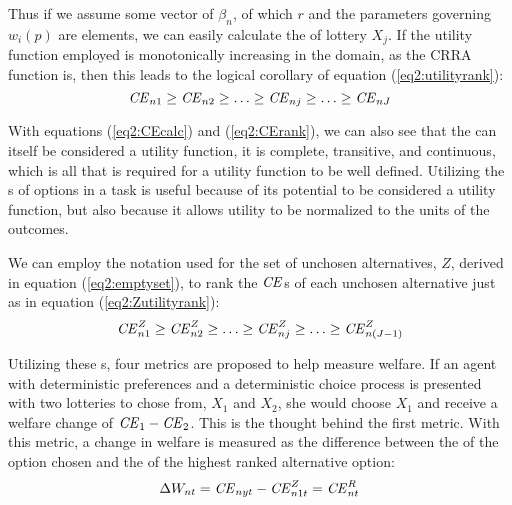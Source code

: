 \documentclass[../main.tex]{subfiles}
\begin{document}
Thus if we assume some vector of $\beta_n$, of which $r$ and the parameters governing $w_i(p)$ are elements, we can easily calculate the {\CE} of lottery $X_j$.{\footnotemark}
If the utility function employed is monotonically increasing in the domain, as the CRRA function is, then this leads to the  logical corollary of equation (\ref{eq2:utilityrank}):
\begin{equation}
	\label{eq2:CErank}
	{\ensuremath{\mathit{CE}}}_{n1} \geq {\ensuremath{\mathit{CE}}}_{n2} \geq \ldots \geq {\ensuremath{\mathit{CE}}}_{nj} \geq \ldots \geq {\ensuremath{\mathit{CE}}}_{nJ}
\end{equation}

\addtocounter{footnote}{-1}

With equations (\ref{eq2:CEcalc}) and (\ref{eq2:CErank}), we can also see that the {\CE} can itself be considered a utility function, it is complete, transitive, and continuous, which is all that is required for a utility function to be well defined.
Utilizing the {\CE}s of options in a task is useful because of its potential to be considered a utility function, but also because it allows utility to be normalized to the units of the outcomes.

We can employ the notation used for the set of unchosen alternatives, $Z$, derived in equation (\ref{eq2:emptyset}), to rank the ${\mathit{CE}}$s of each unchosen alternative just as in equation (\ref{eq2:Zutilityrank}):
\begin{equation}
	\label{eq2:CEZ}
	{\ensuremath{\mathit{CE}}}_{n1}^Z \geq {\ensuremath{\mathit{CE}}}_{n2}^Z \geq \ldots \geq {\ensuremath{\mathit{CE}}}_{nj}^Z \geq \ldots \geq {\ensuremath{\mathit{CE}}}_{n(J-1)}^Z
\end{equation}

Utilizing these {\CE}s, four metrics are proposed to help measure welfare.
If an agent with deterministic preferences and a deterministic choice process is presented with two lotteries to chose from, $X_1$ and $X_2$, she would choose $X_1$ and receive a welfare change of ${\mathit{CE}}_1 - {\mathit{CE}}_2$.
This is the thought behind the first metric.
With this metric, a change in welfare is measured as the difference between the {\CE} of the option chosen and the {\CE} of the highest ranked alternative option:
\begin{equation}
	\label{eq2:WCt}
	\Delta W_{nt} = {\mathit{CE}}_{nyt} - {\mathit{CE}}_{n1t}^Z = {\mathit{CE}}_{nt}^R
\end{equation}
\end{document}
